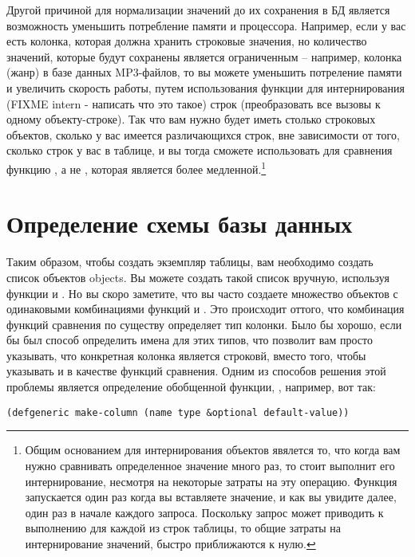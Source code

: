 Другой причиной для нормализации значений до их сохранения в БД является возможность
уменьшить потребление памяти и процессора.  Например, если у вас есть колонка, которая
должна хранить строковые значения, но количество значений, которые будут сохранены
является ограниченным -- например, колонка  (жанр) в базе данных MP3-файлов,
то вы можете уменьшить потреление памяти и увеличить скорость работы, путем использования
функции  для интернирования (FIXME intern - написать что это такое)
строк (преобразовать все вызовы  к одному объекту-строке).  Так что вам
нужно будет иметь столько строковых объектов, сколько у вас имеется различающихся строк,
вне зависимости от того, сколько строк у вас в таблице, и вы тогда сможете использовать
для сравнения функцию , а не , которая является более
медленной.\footnote{Общим основанием для интернирования объектов явялется то, что когда
  вам нужно сравнивать определенное значение много раз, то стоит выполнит его
  интернирование, несмотря на некоторые затраты на эту
  операцию. Функция запускается один раз когда вы вставляете
  значение, и как вы увидите далее, один раз в начале каждого запроса. Поскольку запрос
  может приводить к выполнению  для каждой из строк таблицы, то
  общие затраты на интернирование значений, быстро приближаются к нулю.}

\section{Определение схемы базы данных}

Таким образом, чтобы создать экземпляр таблицы, вам необходимо создать список объектов
 objects.  Вы можете создать такой список вручную, используя функции
 и .  Но вы скоро заметите, что вы часто создаете множество
объектов  с одинаковыми комбинациями функций  и
. Это происходит оттого, что комбинация функций сравнения по
существу определяет тип колонки. Было бы хорошо, если бы был способ определить имена для
этих типов, что позволит вам просто указывать, что конкретная колонка является строковй,
вместо того, чтобы указывать  и  в качестве функций сравнения.
Одним из способов решения этой проблемы является определение обобщенной функции,
, например, вот так:

\begin{lstlisting}
(defgeneric make-column (name type &optional default-value))
\end{lstlisting}

